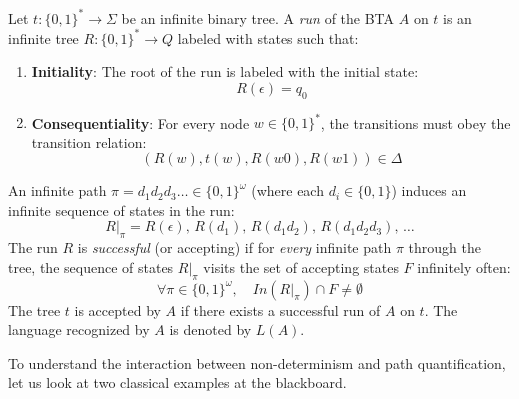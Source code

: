 \begin{definition}
Let $t: \{0,1\}^* \to \Sigma$ be an infinite binary tree. A \emph{run} of the BTA $A$ on $t$ is an infinite tree $R: \{0,1\}^* \to Q$ labeled with states such that:
\begin{enumerate}
    \item \textbf{Initiality}: The root of the run is labeled with the initial state:
    $$R(\epsilon) = q_0$$
    \item \textbf{Consequentiality}: For every node $w \in \{0,1\}^*$, the transitions must obey the transition relation:
    $$(R(w), t(w), R(w0), R(w1)) \in \Delta$$
\end{enumerate}
An infinite path $\pi = d_1 d_2 d_3 \dots \in \{0,1\}^\omega$ (where each $d_i \in \{0,1\}$) induces an infinite sequence of states in the run:
$$R|_\pi = R(\epsilon), \, R(d_1), \, R(d_1 d_2), \, R(d_1 d_2 d_3), \, \dots$$
The run $R$ is \emph{successful} (or accepting) if for \emph{every} infinite path $\pi$ through the tree, the sequence of states $R|_\pi$ visits the set of accepting states $F$ infinitely often:
$$\forall \pi \in \{0,1\}^\omega, \quad In(R|_\pi) \cap F \neq \emptyset$$
The tree $t$ is accepted by $A$ if there exists a successful run of $A$ on $t$. The language recognized by $A$ is denoted by $L(A)$.
\end{definition}


To understand the interaction between non-determinism and path quantification, let us look at two classical examples at the blackboard.

